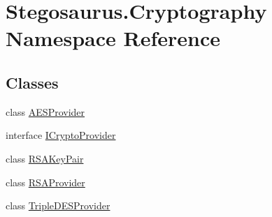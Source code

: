 \hypertarget{namespace_stegosaurus_1_1_cryptography}{}\section{Stegosaurus.\+Cryptography Namespace Reference}
\label{namespace_stegosaurus_1_1_cryptography}
\subsection*{Classes}
\begin{DoxyCompactItemize}
\item 
class \hyperlink{class_stegosaurus_1_1_cryptography_1_1_a_e_s_provider}{A\+E\+S\+Provider}
\item 
interface \hyperlink{interface_stegosaurus_1_1_cryptography_1_1_i_crypto_provider}{I\+Crypto\+Provider}
\item 
class \hyperlink{class_stegosaurus_1_1_cryptography_1_1_r_s_a_key_pair}{R\+S\+A\+Key\+Pair}
\item 
class \hyperlink{class_stegosaurus_1_1_cryptography_1_1_r_s_a_provider}{R\+S\+A\+Provider}
\item 
class \hyperlink{class_stegosaurus_1_1_cryptography_1_1_triple_d_e_s_provider}{Triple\+D\+E\+S\+Provider}
\end{DoxyCompactItemize}
